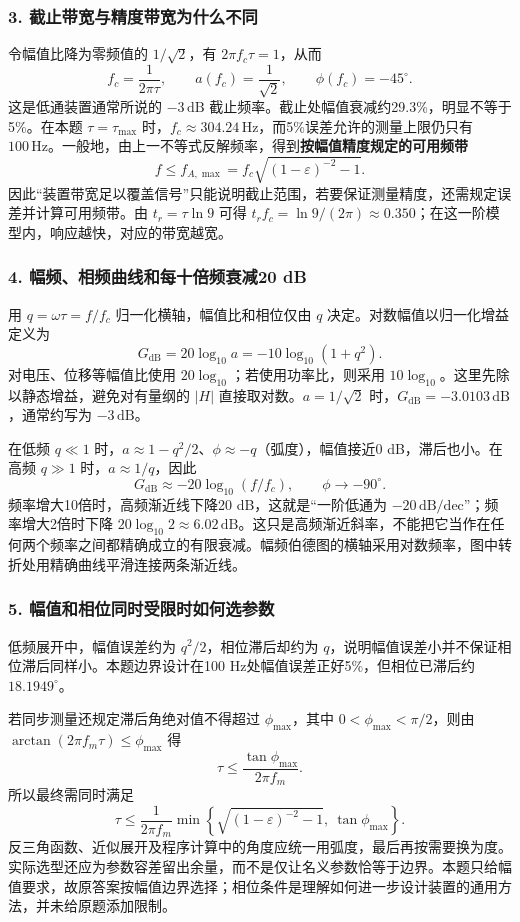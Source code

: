 \subsubsection*{3. 截止带宽与精度带宽为什么不同}
令幅值比降为零频值的 $1/\sqrt2$，有 $2\pi f_c\tau=1$，从而
\[
\boxed{f_c=\frac{1}{2\pi\tau}},\qquad
a(f_c)=\frac{1}{\sqrt2},\qquad \phi(f_c)=-45^\circ.
\]
这是低通装置通常所说的 $-3\,\mathrm{dB}$ 截止频率。截止处幅值衰减约29.3\%，明显不等于5\%。在本题 $\tau=\tau_{\max}$ 时，$f_c\approx304.24\,\mathrm{Hz}$，而5\%误差允许的测量上限仍只有 $100\,\mathrm{Hz}$。一般地，由上一不等式反解频率，得到\textbf{按幅值精度规定的可用频带}
\[
f\leq f_{A,\max}
=f_c\sqrt{(1-\varepsilon)^{-2}-1}.
\]
因此“装置带宽足以覆盖信号”只能说明截止范围，若要保证测量精度，还需规定误差并计算可用频带。由 $t_r=\tau\ln9$ 可得 $t_rf_c=\ln9/(2\pi)\approx0.350$；在这一阶模型内，响应越快，对应的带宽越宽。

\subsubsection*{4. 幅频、相频曲线和每十倍频衰减20 dB}
用 $q=\omega\tau=f/f_c$ 归一化横轴，幅值比和相位仅由 $q$ 决定。对数幅值以归一化增益定义为
\[
G_{\mathrm{dB}}=20\log_{10}a
=-10\log_{10}(1+q^2).
\]
对电压、位移等幅值比使用 $20\log_{10}$；若使用功率比，则采用 $10\log_{10}$。这里先除以静态增益，避免对有量纲的 $|H|$ 直接取对数。$a=1/\sqrt2$ 时，$G_{\mathrm{dB}}=-3.0103\,\mathrm{dB}$，通常约写为 $-3\,\mathrm{dB}$。

在低频 $q\ll1$ 时，$a\approx1-q^2/2$、$\phi\approx-q$（弧度），幅值接近0 dB，滞后也小。在高频 $q\gg1$ 时，$a\approx1/q$，因此
\[
G_{\mathrm{dB}}\approx-20\log_{10}(f/f_c),
\qquad \phi\longrightarrow-90^\circ.
\]
频率增大10倍时，高频渐近线下降20 dB，这就是“一阶低通为 $-20\,\mathrm{dB/dec}$”；频率增大2倍时下降 $20\log_{10}2\approx6.02\,\mathrm{dB}$。这只是高频渐近斜率，不能把它当作在任何两个频率之间都精确成立的有限衰减。幅频伯德图的横轴采用对数频率，图中转折处用精确曲线平滑连接两条渐近线。

\subsubsection*{5. 幅值和相位同时受限时如何选参数}
低频展开中，幅值误差约为 $q^2/2$，相位滞后却约为 $q$，说明幅值误差小并不保证相位滞后同样小。本题边界设计在100 Hz处幅值误差正好5\%，但相位已滞后约 $18.1949^\circ$。

若同步测量还规定滞后角绝对值不得超过 $\phi_{\max}$，其中 $0<\phi_{\max}<\pi/2$，则由 $\arctan(2\pi f_m\tau)\leq\phi_{\max}$ 得
\[
\tau\leq\frac{\tan\phi_{\max}}{2\pi f_m}.
\]
所以最终需同时满足
\[
\boxed{\tau\leq\frac{1}{2\pi f_m}
\min\left\{\sqrt{(1-\varepsilon)^{-2}-1},\ \tan\phi_{\max}\right\}}.
\]
反三角函数、近似展开及程序计算中的角度应统一用弧度，最后再按需要换为度。实际选型还应为参数容差留出余量，而不是仅让名义参数恰等于边界。本题只给幅值要求，故原答案按幅值边界选择；相位条件是理解如何进一步设计装置的通用方法，并未给原题添加限制。

